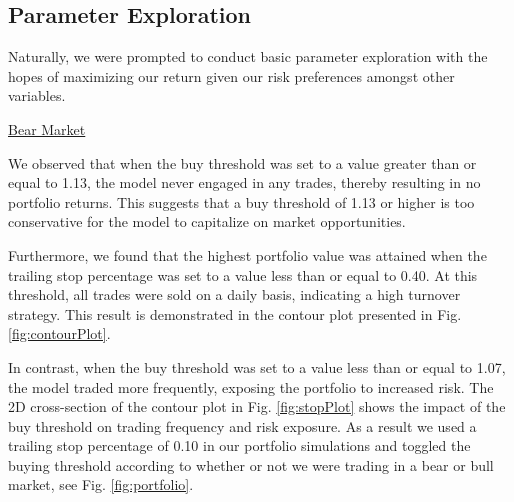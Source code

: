 \documentclass{article}
\begin{document}
\subsection{Parameter Exploration}
Naturally, we were prompted to conduct basic parameter exploration with the hopes of maximizing our return given our risk preferences amongst other variables.


\underline{Bear Market}

We observed that when the buy threshold was set to a value greater than or equal to 1.13, the model never engaged in any trades, thereby resulting in no portfolio returns. This suggests that a buy threshold of 1.13 or higher is too conservative for the model to capitalize on market opportunities.

Furthermore, we found that the highest portfolio value was attained when the trailing stop percentage was set to a value less than or equal to 0.40. At this threshold, all trades were sold on a daily basis, indicating a high turnover strategy. This result is demonstrated in the contour plot presented in Fig. \ref{fig:contourPlot}.

In contrast, when the buy threshold was set to a value less than or equal to 1.07, the model traded more frequently, exposing the portfolio to increased risk. The 2D cross-section of the contour plot in Fig. \ref{fig:stopPlot} shows the impact of the buy threshold on trading frequency and risk exposure. As a result we used a trailing stop percentage of 0.10 in our portfolio simulations and toggled the buying threshold according to whether or not we were trading in a bear or bull market, see Fig. \ref{fig:portfolio}.
\end{document}
